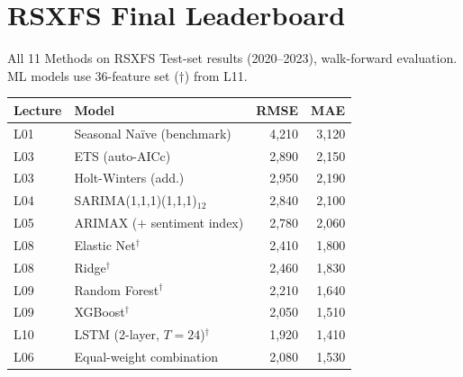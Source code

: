\documentclass[aspectratio=169, 10pt]{beamer}
\begin{document}
\section{RSXFS Final Leaderboard}


\begin{frame}{All 11 Methods on RSXFS}
  {\footnotesize Test-set results (2020--2023), walk-forward evaluation.
  ML models use 36-feature set ($\dagger$) from L11.}
  \vspace{0.1cm}
  \begin{center}
  {\footnotesize
  \begin{tabular}{llrr}
    \toprule
    \textbf{Lecture} & \textbf{Model} & \textbf{RMSE} & \textbf{MAE} \\
    \midrule
    L01 & Seasonal Na\"{i}ve (benchmark) & 4{,}210 & 3{,}120 \\
    L03 & ETS (auto-AICc)               & 2{,}890 & 2{,}150 \\
    L03 & Holt-Winters (add.)           & 2{,}950 & 2{,}190 \\
    L04 & SARIMA(1,1,1)(1,1,1)$_{12}$   & 2{,}840 & 2{,}100 \\
    L05 & ARIMAX ($+$ sentiment index)  & 2{,}780 & 2{,}060 \\
    L08 & Elastic Net$^\dagger$         & 2{,}410 & 1{,}800 \\
    L08 & Ridge$^\dagger$               & 2{,}460 & 1{,}830 \\
    L09 & Random Forest$^\dagger$       & 2{,}210 & 1{,}640 \\
    L09 & XGBoost$^\dagger$             & 2{,}050 & 1{,}510 \\
    L10 & LSTM (2-layer, $T=24$)$^\dagger$ & 1{,}920 & 1{,}410 \\
    L06 & Equal-weight combination      & 2{,}080 & 1{,}530 \\
    \bottomrule
  \end{tabular}
  }
  \end{center}
  \vspace{0.05cm}
\end{frame}
\end{document}
